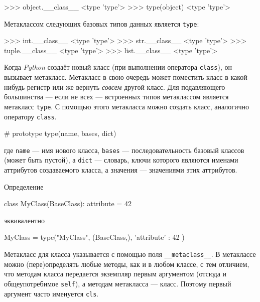 \begin{pylst}{}{}
>>> object.__class__
<type 'type'>
>>> type(object)
<type 'type'>
\end{pylst}

Метаклассом следующих базовых типов данных является \lstinline{type}:
\begin{pylst}{}{}
>>> int.__class__
<type 'type'>
>>> str.__class__
<type 'type'>
>>> tuple.__class__
<type 'type'>
>>> list.__class__
<type 'type'>
\end{pylst}

Когда \emph{Python} создаёт новый класс (при выполнении оператора \lstinline{class}), он вызывает метакласс. Метакласс в свою очередь может поместить класс в какой-нибудь регистр или же вернуть \emph{совсем} другой класс. Для подавляющего большинства — если не всех — встроенных типов метаклассом является метакласс \lstinline{type}. С помощью этого метакласса можно создать класс, аналогично оператору \lstinline{class}.

\begin{pylst}{}{}
# prototype
type(name, bases, dict)
\end{pylst}
где \lstinline{name} — имя нового класса, \lstinline{bases} — последовательность базовый классов (может быть пустой), а \lstinline{dict} — словарь, ключи которого являются именами аттрибутов создаваемого класса, а значения — значениями этих аттрибутов.

Определение
\begin{pylst}{}{}
class MyClass(BaseClass):
    attribute = 42
\end{pylst}
эквивалентно
\begin{pylst}{}{}
MyClass = type("MyClass", (BaseClass,), { 'attribute' : 42 })
\end{pylst}

Метакласс для класса указывается с помощью поля \lstinline{__metaclass__}. В метаклассе можно (пере)определять любые методы, как и в любом классе, с тем отличием, что методам класса передается экземпляр первым аргументом (отсюда и общеупотребимое \lstinline{self}), а методам метакласса — класс. Поэтому первый аргумент часто именуется \lstinline{cls}.

